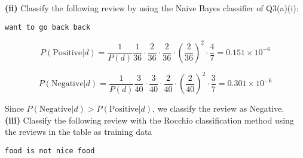 \documentclass[11pt,a4paper]{report}
\begin{document}
\begin{multicols*}{2}
\noindent \textbf{(ii)} Classify the following review by using the Naive Bayes classifier of Q3(a)(i):
\begin{center}\verb|want to go back back|\end{center}

\scriptsize
$$P(\text{Positive}|d) = \frac{1}{P(d)} \frac{1}{36} \cdot \frac{2}{36} \cdot \frac{2}{36} \cdot (\frac{2}{36})^2 \cdot \frac{4}{7}= 0.151 \times 10^{-6}$$

$$P(\text{Negative}|d) = \frac{1}{P(d)} \frac{3}{40} \cdot \frac{3}{40} \cdot \frac{2}{40} \cdot (\frac{2}{40})^2  \cdot \frac{3}{7}= 0.301 \times 10^{-6}$$
\normalsize

\noindent Since $P(\text{Negative}|d) > P(\text{Positive}|d)$, we classify the review as Negative.\\

\noindent \textbf{(iii)} Classify the following review with the Rocchio classification method using the reviews in the table as training data
\begin{center}\verb|food is not nice food|\end{center}


\end{multicols*}
\end{document}
